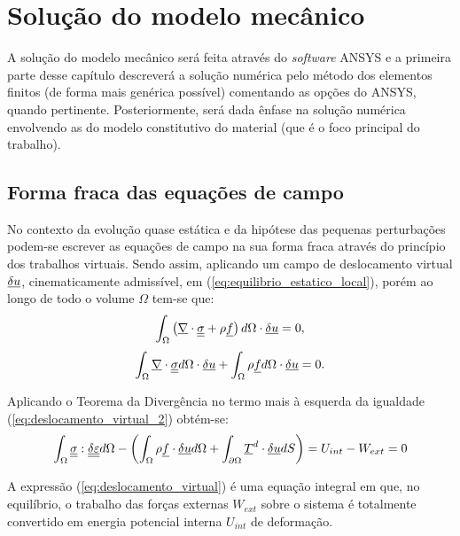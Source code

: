 \chapter{Solução do modelo mecânico}
A solução do modelo mecânico será feita através do \textit{software} ANSYS e a primeira parte desse capítulo descreverá a solução numérica pelo método dos elementos finitos (de forma mais genérica possível) comentando as opções do ANSYS, quando pertinente. Posteriormente, será dada ênfase na solução numérica envolvendo as do modelo constitutivo do material (que é o foco principal do trabalho). 

\section{Forma fraca das equações de campo}
No contexto da evolução quase estática e da hipótese das pequenas perturbações podem-se escrever as equações de campo na sua forma fraca através do princípio dos trabalhos virtuais. Sendo assim, aplicando um campo de deslocamento virtual $\underline {\delta u}$, cinematicamente admissível, em (\ref{eq:equilibrio_estatico_local}), porém ao longo de todo o volume $\Omega$ tem-se que:
\begin{equation}
	\label{eq:deslocamento_virtual}
	\int_{\Omega} \left(\underline \nabla \cdot \underline{\underline \sigma} + \rho \underline f \right)d\Omega \cdot \underline {\delta u} = 0,
\end{equation}
\begin{equation}
	\label{eq:deslocamento_virtual_2}
	\int_{\Omega} \underline \nabla \cdot \underline{\underline \sigma} d\Omega \cdot \underline {\delta u} + \int_{\Omega} \rho \underline f d\Omega \cdot \underline {\delta u} = 0.
\end{equation}

Aplicando o Teorema da Divergência no termo mais à esquerda da igualdade (\ref{eq:deslocamento_virtual_2}) obtém-se:
\begin{equation}
	\label{eq:deslocamento_virtual_3}
	\int_{\Omega} \underline{\underline \sigma} : \underline{\underline {\delta \varepsilon}} d\Omega - \left(\int_{\Omega} \rho \underline f \cdot \underline {\delta u} d\Omega + \int_{\partial \Omega} \underline T^d \cdot \underline {\delta u} dS \right) = U_{int} - W_{ext} = 0
\end{equation}

A expressão (\ref{eq:deslocamento_virtual}) é uma equação integral em que, no equilíbrio, o trabalho das forças externas $W_{ext}$ sobre o sistema é totalmente convertido em energia potencial interna $U_{int}$  de deformação.

